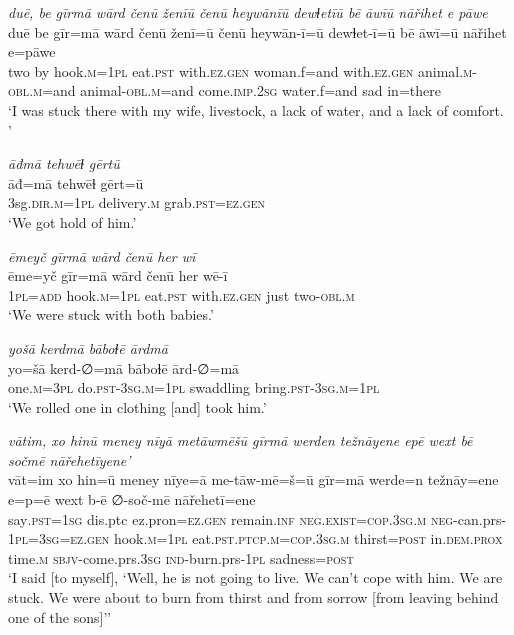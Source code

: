 \ea \label{ZQ.16}
\textit{duē, be gīrmā wārd čenū ženīū čenū heywānīū dewɫetīū bē āwīū nāřihet e pāwe} \\ 
\gll duē be gīr=mā wārd čenū ženī=ū čenū heywān-ī=ū dewɫet-ī=ū bē āwī=ū nāřihet e=pāwe \\ 
 two by hook\textsc{.m}\textsc{=\textsc{1pl}} eat\textsc{.pst} with\textsc{.ez.gen} woman.f=and with\textsc{.ez.gen} animal\textsc{.m}\textsc{-obl}\textsc{.m}=and animal\textsc{-obl}\textsc{.m}=and come\textsc{.imp}\textsc{.\textsc{2sg}} water.f=and sad in=there \\ 
\glt `I was stuck there with my wife, livestock, a lack of water, and a lack of comfort. '
\z 
 
\ea \label{ZQ.18}
\textit{āđmā tehwēɫ gērtū} \\ 
\gll āđ=mā tehwēɫ gērt=ū \\ 
 3sg\textsc{.dir}\textsc{.m}\textsc{=\textsc{1pl}} delivery\textsc{.m} grab\textsc{.pst}\textsc{=ez.gen} \\ 
\glt `We got hold of him.'
\z 
 
\ea \label{ZQ.21}
\textit{ēmeyč gīrmā wārd čenū her wī} \\ 
\gll ēme=yč gīr=mā wārd čenū her wē-ī \\ 
 \textsc{1pl}\textsc{=add} hook\textsc{.m}\textsc{=\textsc{1pl}} eat\textsc{.pst} with\textsc{.ez.gen} just two\textsc{-obl}\textsc{.m} \\ 
\glt `We were stuck with both babies.'
\z 
 
\ea \label{ZQ.22}
\textit{yošā kerdmā bāboɫē ārdmā} \\ 
\gll yo=šā kerd-∅=mā bāboɫē ārd-∅=mā \\ 
 one\textsc{.m}\textsc{=3pl} do\textsc{.pst}\textsc{-3sg}\textsc{.m}\textsc{=\textsc{1pl}} swaddling bring\textsc{.pst}\textsc{-3sg}\textsc{.m}\textsc{=\textsc{1pl}} \\ 
\glt `We rolled one in clothing [and] took him.'
\z 
 
\ea \label{ZQ.25}
\textit{vātim, xo hinū meney nīyā metāwmēšū gīrmā werden težnāyene epē wext bē sočmē nāřehetīyene’} \\ 
\gll vāt=im xo hin=ū meney nīye=ā me-tāw-mē=š=ū gīr=mā werde=n težnāy=ene e=p=ē wext b-ē ∅-soč-mē nāřehetī=ene \\ 
 say\textsc{.pst}\textsc{=\textsc{1sg}} dis.ptc ez.pron\textsc{=ez.gen} remain\textsc{.inf} \textsc{\textsc{neg.}exist}\textsc{=cop}\textsc{.3sg}\textsc{.m} \textsc{neg-}can.prs\textsc{-\textsc{1pl}}\textsc{=3sg}\textsc{=ez.gen} hook\textsc{.m}\textsc{=\textsc{1pl}} eat\textsc{.pst}\textsc{.ptcp}\textsc{.m}\textsc{=cop}\textsc{.3sg}\textsc{.m} thirst\textsc{=\textsc{post}} in.\textsc{dem.prox} time\textsc{.m} \textsc{sbjv-}come.prs\textsc{.3sg} \textsc{ind-}burn.prs\textsc{-\textsc{1pl}} sadness\textsc{=\textsc{post}} \\ 
\glt `I said [to myself], ‘Well, he is not going to live. We can’t cope with him. We are stuck. We were about to burn from thirst and from sorrow [from leaving behind one of the sons]’'
\z 
 
